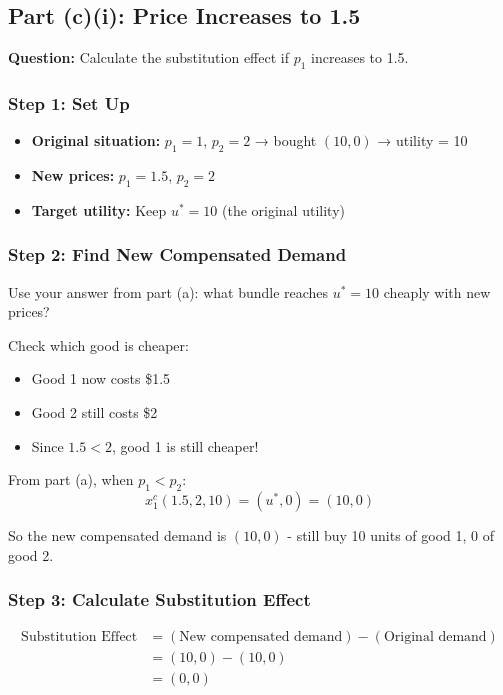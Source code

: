 \documentclass[11pt]{article}
\begin{document}
\subsection{Part (c)(i): Price Increases to 1.5}

\textbf{Question:} Calculate the substitution effect if $p_1$ increases to 1.5.

\subsubsection{Step 1: Set Up}

\begin{itemize}
\item \textbf{Original situation:} $p_1 = 1$, $p_2 = 2$ → bought $(10, 0)$ → utility = 10
\item \textbf{New prices:} $p_1 = 1.5$, $p_2 = 2$
\item \textbf{Target utility:} Keep $u^* = 10$ (the original utility)
\end{itemize}

\subsubsection{Step 2: Find New Compensated Demand}

Use your answer from part (a): what bundle reaches $u^* = 10$ cheaply with new prices?

Check which good is cheaper:
\begin{itemize}
\item Good 1 now costs \$1.5
\item Good 2 still costs \$2
\item Since $1.5 < 2$, good 1 is still cheaper!
\end{itemize}

From part (a), when $p_1 < p_2$:
$$x_1^c(1.5, 2, 10) = (u^*, 0) = (10, 0)$$

So the new compensated demand is $(10, 0)$ - still buy 10 units of good 1, 0 of good 2.

\subsubsection{Step 3: Calculate Substitution Effect}

\begin{align*}
\text{Substitution Effect} &= (\text{New compensated demand}) - (\text{Original demand}) \\
&= (10, 0) - (10, 0) \\
&= (0, 0)
\end{align*}
\end{document}
